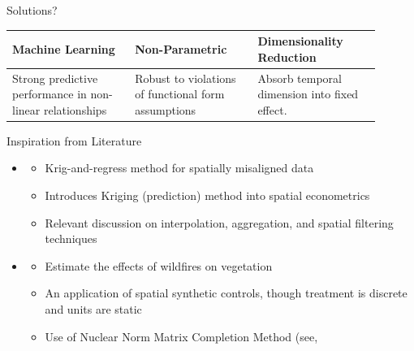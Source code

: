 \begin{frame}{Solutions?}

    \begin{table}[htbp]
    \centering
    \begin{tabular}{|p{0.3\linewidth}|p{0.3\linewidth}|p{0.3\linewidth}|}
    \hline
    \textbf{Machine Learning} & \textbf{Non-Parametric} & \textbf{Dimensionality Reduction} \\
    \hline
    Strong predictive performance in non-linear relationships & Robust to violations of functional form assumptions & Absorb temporal dimension into fixed effect. \
    \end{tabular}
    \end{table}
\end{frame}

\begin{frame}{Inspiration from Literature}

\begin{itemize}
    \item \cite{pouliot2022}
      \begin{itemize}
        \item Krig-and-regress method for spatially misaligned data
        \item Introduces Kriging (prediction) method into spatial econometrics
        \item Relevant discussion on interpolation, aggregation, and spatial filtering techniques
      \end{itemize}
    \vspace{-7pt}
    \item \cite{serraburieletal2020}
      \begin{itemize}
        \item Estimate the effects of wildfires on vegetation
        \item An application of spatial synthetic controls, though treatment is discrete and units are static
        \item Use of Nuclear Norm Matrix Completion Method (see, \cite{athey2021}
      \end{itemize}
  \end{itemize}
\end{frame}